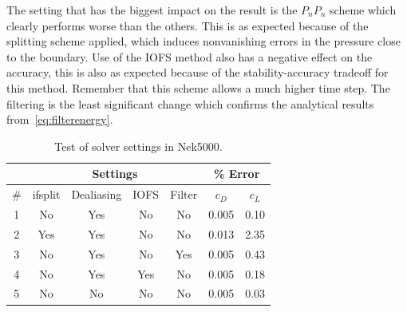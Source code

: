 The setting that has the biggest impact on the result is the $P_nP_n$ scheme which clearly performs 
worse than the others. This is as expected because of the splitting scheme applied, which 
induces nonvanishing errors in the pressure close to the boundary. 
Use of the IOFS method also has a negative effect on the accuracy,
this is also as expected because of the stability-accuracy tradeoff for this method.
Remember that this scheme allows a much higher time step. The filtering is the least significant change
which confirms the analytical results from~\ref{eq:filterenergy}. 
%
\begin{table}[h]
    \centering
    \begin{tabular}{c | c c c c | c c }
         & \multicolumn{4}{|c|}{Settings} & \multicolumn{2}{|c}{\% Error} \\\hline
         \#  & ifsplit & Dealiasing & IOFS & Filter & $c_D$ & $c_L$ \\  \hline 
         1 & No & Yes& No & No & 0.005 & 0.10\\
         2 & Yes& Yes& No & No & 0.013 & 2.35\\
         3 & No & Yes& No & Yes& 0.005 & 0.43\\
         4 & No & Yes& Yes& No & 0.005 & 0.18\\
         5 & No & No & No & No & 0.005 & 0.03\\
    \end{tabular}
    \caption{Test of solver settings in Nek5000.}
    \label{tab:perf}
\end{table}
%

